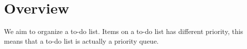 \section{Overview}

We aim to organize a to-do list.
Items on a to-do list has different priority, this means that a to-do list is 
actually a priority queue.



